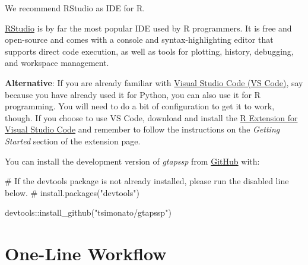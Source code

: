 \documentclass[
  letterpaper,
  DIV=11,
  numbers=noendperiod]{scrartcl}
\newenvironment{Shaded}{}{}
\newcommand{\CommentTok}[1]{\textcolor[rgb]{0.54,0.53,0.53}{#1}}
\newcommand{\FunctionTok}[1]{\textcolor[rgb]{0.39,0.29,0.61}{#1}}
\newcommand{\NormalTok}[1]{\textcolor[rgb]{0.12,0.11,0.11}{#1}}
\newcommand{\SpecialCharTok}[1]{\textcolor[rgb]{0.24,0.68,0.91}{#1}}
\newcommand{\StringTok}[1]{\textcolor[rgb]{0.75,0.01,0.01}{#1}}
\begin{document}
\begin{tcolorbox}[enhanced jigsaw, leftrule=.75mm, toprule=.15mm, breakable, titlerule=0mm, opacitybacktitle=0.6, colframe=quarto-callout-tip-color-frame, arc=.35mm, bottomtitle=1mm, toptitle=1mm, title=\textcolor{quarto-callout-tip-color}{\faLightbulb}\hspace{0.5em}{IDE install details}, rightrule=.15mm, colback=white, bottomrule=.15mm, opacityback=0, left=2mm, colbacktitle=quarto-callout-tip-color!10!white, coltitle=black]

We recommend RStudio as IDE for R.

\href{https://posit.co/download/rstudio-desktop/}{RStudio} is by far the
most popular IDE used by R programmers. It is free and open-source and
comes with a console and syntax-highlighting editor that supports direct
code execution, as well as tools for plotting, history, debugging, and
workspace management.

\textbf{Alternative}: If you are already familiar with
\href{https://code.visualstudio.com/}{Visual Studio Code (VS Code)}, say
because you have already used it for Python, you can also use it for R
programming. You will need to do a bit of configuration to get it to
work, though. If you choose to use VS Code, download and install the
\href{https://marketplace.visualstudio.com/items?itemName=Ikuyadeu.r}{R
Extension for Visual Studio Code} and remember to follow the
instructions on the \emph{Getting Started} section of the extension
page.

\end{tcolorbox}

You can install the development version of \emph{gtapssp} from
\href{https://github.com/tsimonato/gtapssp}{GitHub} with:

\begin{Shaded}
\begin{Highlighting}[]
\CommentTok{\# If the devtools package is not already installed, please run the disabled line below.}
\CommentTok{\# install.packages("devtools")}

\NormalTok{devtools}\SpecialCharTok{::}\FunctionTok{install\_github}\NormalTok{(}\StringTok{"tsimonato/gtapssp"}\NormalTok{)}
\end{Highlighting}
\end{Shaded}

\section{One-Line Workflow}\label{one-line-workflow}
\end{document}

